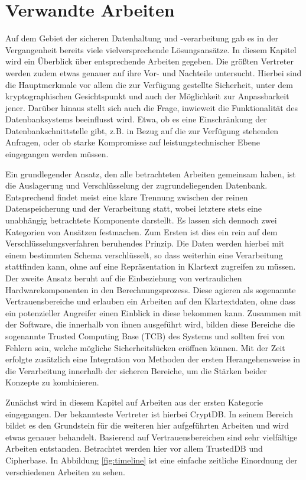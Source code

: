 \section{Verwandte Arbeiten}
Auf dem Gebiet der sicheren Datenhaltung und -verarbeitung gab es in der Vergangenheit bereits viele vielversprechende Lösungsansätze. In diesem Kapitel wird ein Überblick über entsprechende Arbeiten gegeben. Die größten Vertreter werden zudem etwas genauer auf ihre Vor- und Nachteile untersucht. Hierbei sind die Hauptmerkmale vor allem die zur Verfügung gestellte Sicherheit, unter dem kryptographischen Gesichtspunkt und auch der Möglichkeit zur Anpassbarkeit jener. Darüber hinaus stellt sich auch die Frage, inwieweit die Funktionalität des Datenbanksystems beeinflusst wird. Etwa, ob es eine Einschränkung der Datenbankschnittstelle gibt, z.B. in Bezug auf die zur Verfügung stehenden Anfragen, oder ob starke Kompromisse auf leistungstechnischer Ebene eingegangen werden müssen.

Ein grundlegender Ansatz, den alle betrachteten Arbeiten gemeinsam haben, ist die Auslagerung und Verschlüsselung der zugrundeliegenden Datenbank. Entsprechend findet meist eine klare Trennung zwischen der reinen Datenspeicherung und der Verarbeitung statt, wobei letztere stets eine unabhängig betrachtete Komponente darstellt. Es lassen sich dennoch zwei Kategorien von Ansätzen festmachen. Zum Ersten ist dies ein rein auf dem Verschlüsselungsverfahren beruhendes Prinzip. Die Daten werden hierbei mit einem bestimmten Schema verschlüsselt, so dass weiterhin eine Verarbeitung stattfinden kann, ohne auf eine Repräsentation in Klartext zugreifen zu müssen. Der zweite Ansatz beruht auf die Einbeziehung von vertraulichen Hardwarekomponenten in den Berechnungsprozess. Diese agieren als sogenannte Vertrauensbereiche und erlauben ein Arbeiten auf den Klartextdaten, ohne dass ein potenzieller Angreifer einen Einblick in diese bekommen kann. Zusammen mit der Software, die innerhalb von ihnen ausgeführt wird, bilden diese Bereiche die sogenannte Trusted Computing Base (TCB) des Systems und sollten frei von Fehlern sein, welche mögliche Sicherheitslücken eröffnen können. Mit der Zeit erfolgte zusätzlich eine Integration von Methoden der ersten Herangehensweise in die Verarbeitung innerhalb der sicheren Bereiche, um die Stärken beider Konzepte zu kombinieren.

Zunächst wird in diesem Kapitel auf Arbeiten aus der ersten Kategorie eingegangen. Der bekannteste Vertreter ist hierbei CryptDB. In seinem Bereich bildet es den Grundstein für die weiteren hier aufgeführten Arbeiten und wird etwas genauer behandelt. Basierend auf Vertrauensbereichen sind sehr vielfältige Arbeiten entstanden. Betrachtet werden hier vor allem TrustedDB und Cipherbase. In Abbildung \ref{fig:timeline} ist eine einfache zeitliche Einordnung der verschiedenen Arbeiten zu sehen.

